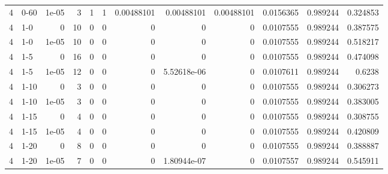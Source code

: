 \begin{tabular}{rlrrrrrrrrrr}
     4 & 0-60   &      1e-05 &           3 &                 1 &                 1 &     0.00488101  &     0.00488101  &      0.00488101  &        0.0156365 &               0.989244 &           0.324853 \\
     4 & 1-0    &      0     &          10 &                 0 &                 0 &     0           &     0           &      0           &        0.0107555 &               0.989244 &           0.387575 \\
     4 & 1-0    &      1e-05 &          10 &                 0 &                 0 &     0           &     0           &      0           &        0.0107555 &               0.989244 &           0.518217 \\
     4 & 1-5    &      0     &          16 &                 0 &                 0 &     0           &     0           &      0           &        0.0107555 &               0.989244 &           0.474098 \\
     4 & 1-5    &      1e-05 &          12 &                 0 &                 0 &     0           &     5.52618e-06 &      0           &        0.0107611 &               0.989244 &           0.6238   \\
     4 & 1-10   &      0     &           3 &                 0 &                 0 &     0           &     0           &      0           &        0.0107555 &               0.989244 &           0.306273 \\
     4 & 1-10   &      1e-05 &           3 &                 0 &                 0 &     0           &     0           &      0           &        0.0107555 &               0.989244 &           0.383005 \\
     4 & 1-15   &      0     &           4 &                 0 &                 0 &     0           &     0           &      0           &        0.0107555 &               0.989244 &           0.308755 \\
     4 & 1-15   &      1e-05 &           4 &                 0 &                 0 &     0           &     0           &      0           &        0.0107555 &               0.989244 &           0.420809 \\
     4 & 1-20   &      0     &           8 &                 0 &                 0 &     0           &     0           &      0           &        0.0107555 &               0.989244 &           0.388887 \\
     4 & 1-20   &      1e-05 &           7 &                 0 &                 0 &     0           &     1.80944e-07 &      0           &        0.0107557 &               0.989244 &           0.545911 \\

\end{tabular}
